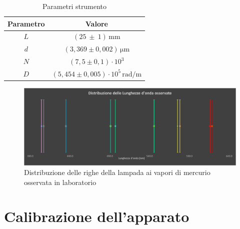 \documentclass{article}
\begin{document}
        \begin{table}[H]

            \centering

            \begin{tabular}{c c}

                \toprule 

                \textbf{Parametro} & \textbf{Valore}    \\

                \midrule

                $L$  & $(25\ \pm \ 1)\, \mathrm{mm}$    \\
                $d$  & $(3,369 \pm 0,002)\, \mathrm{\mu m}$    \\
                $N$  & $(7,5 \pm 0,1) \cdot 10^3$           \\
                $D$  & $(5,454 \pm 0,005) \cdot 10^5 \, \mathrm{rad/m}$   \\
                
                \bottomrule

            \end{tabular}

            \caption{Parametri strumento}
            \label{tabular:Parametri strumento}
            
        \end{table}

        \begin{figure}[H]

            \centering
            \includegraphics[width = 15cm]{../images/spettro.png}
            \caption{Distribuzione delle righe della lampada ai vapori di mercurio osservata in laboratorio}
            \label{fig:Distriduzione spettro}
            
        \end{figure}
       
    
    \section{Calibrazione dell'apparato}
\end{document}
